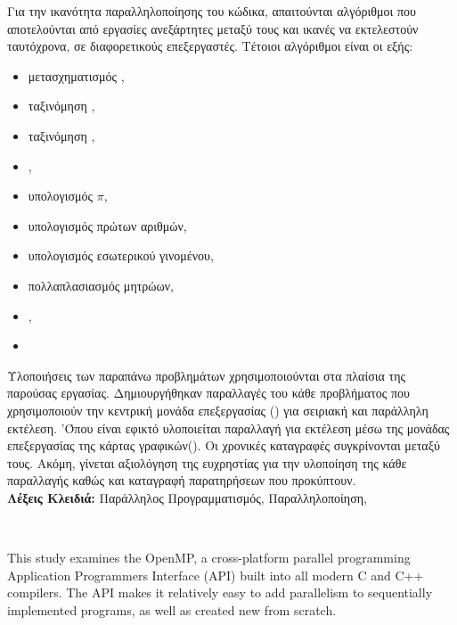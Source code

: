 Για την ικανότητα παραλληλοποίησης του κώδικα, απαιτούνται αλγόριθμοι που αποτελούνται από εργασίες
ανεξάρτητες μεταξύ τους και ικανές να εκτελεστούν ταυτόχρονα, σε διαφορετικούς επεξεργαστές. Τέτοιοι
αλγόριθμοι είναι οι εξής:

\begin{itemize}
\setlength\itemsep{-0.8em}
    \item μετασχηματισμός \emph{}, 
    \item ταξινόμηση \emph{},
    \item ταξινόμηση \emph{},
    \item \emph{},
    \item υπολογισμός $\pi$, 
    \item υπολογισμός πρώτων αριθμών,
    \item υπολογισμός εσωτερικού γινομένου,
    \item πολλαπλασιασμός μητρώων,
    \item {},
    \item {}
\end{itemize}

Υλοποιήσεις των παραπάνω προβλημάτων χρησιμοποιούνται στα πλαίσια της παρούσας εργασίας.
Δημιουργήθηκαν παραλλαγές του κάθε προβλήματος που χρησιμοποιούν την κεντρική μονάδα επεξεργασίας
(\textbf{}) για σειριακή και παράλληλη εκτέλεση. 'Όπου είναι εφικτό υλοποιείται παραλλαγή
για εκτέλεση μέσω της μονάδας επεξεργασίας της κάρτας γραφικών(\textbf{}). Οι χρονικές
καταγραφές συγκρίνονται μεταξύ τους. Ακόμη, γίνεται αξιολόγηση της ευχρηστίας για την υλοποίηση της
κάθε παραλλαγής καθώς και καταγραφή παρατηρήσεων που προκύπτουν.\\[1 cm]

\indent \textbf{Λέξεις Κλειδιά:} Παράλληλος Προγραμματισμός, Παραλληλοποίηση, 

\clearpage
{}
\begin{flushleft}

{\large \textbf{}}\\[0.5 cm]
\end{flushleft}
This study examines the OpenMP, a cross-platform parallel programming Application Programmers Interface (API) built into all modern C and C++ compilers. The API makes it relatively easy to add parallelism to sequentially implemented programs, as well as created new from scratch.

